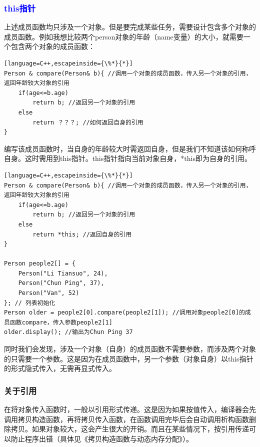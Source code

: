 \documentclass[UTF8]{ctexart}
\begin{document}
\subsubsection{\textcolor{blue}{this指针}}
上述成员函数均只涉及一个对象。但是要完成某些任务，需要设计包含多个对象的成员函数。例如我想比较两个person对象的年龄（name变量）的大小，就需要一个包含两个对象的成员函数：
\begin{lstlisting}[language=C++,escapeinside={\%*}{*}]
Person & compare(Person& b){ //调用一个对象的成员函数，传入另一个对象的引用，返回年龄较大对象的引用
	if(age<=b.age)
		return b; //返回另一个对象的引用
	else 
		return ？？？; //如何返回自身的引用
}
\end{lstlisting}
编写该成员函数时，当自身的年龄较大时需返回自身，但是我们不知道该如何称呼自身。这时需用到this指针。this指针指向当前对象自身，*this即为自身的引用。
\begin{lstlisting}[language=C++,escapeinside={\%*}{*}]
Person & compare(Person& b){ //调用一个对象的成员函数，传入另一个对象的引用，返回年龄较大对象的引用
	if(age<=b.age)
		return b; //返回另一个对象的引用
	else 
		return *this; //返回自身的引用
}

Person people2[] = {
	Person("Li Tiansuo", 24),
	Person("Chun Ping", 37),
	Person("Van", 52)
}; // 列表初始化
Person older = people2[0].compare(people2[1]); //调用对象people2[0]的成员函数compare，传入参数people2[1]
older.display(); //输出为Chun Ping 37
\end{lstlisting}
同时我们会发现，涉及一个对象（自身）的成员函数不需要参数，而涉及两个对象的只需要一个参数。这是因为在成员函数中，另一个参数（对象自身）以this指针的形式隐式传入，无需再显式传入。
\subsubsection{关于引用}
在将对象传入函数时，一般以引用形式传递。这是因为如果按值传入，编译器会先调用拷贝构造函数，再将拷贝传入函数，在函数调用完毕后会自动调用析构函数删除拷贝。如果对象较大，这会产生很大的开销。而且在某些情况下，按引用传递可以防止程序出错（具体见《拷贝构造函数与动态内存分配》）。
\end{document}
